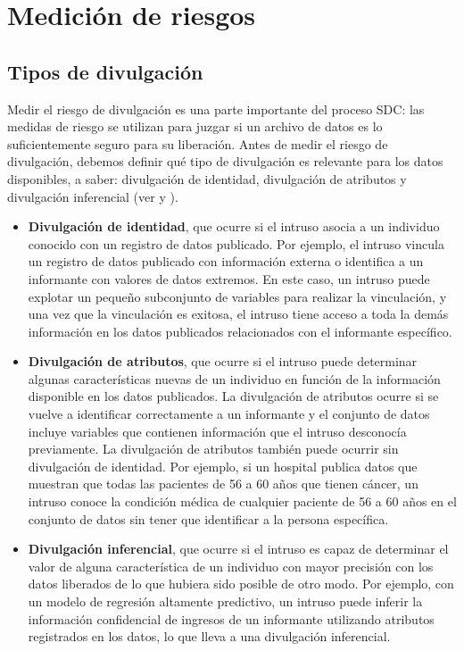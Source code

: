 \documentclass[]{book}
\theoremstyle{definition}
\theoremstyle{definition}
\theoremstyle{definition}
\theoremstyle{definition}
\theoremstyle{remark}
\begin{document}
\hypertarget{mediciuxf3n-de-riesgos}{%
\chapter{Medición de riesgos}\label{mediciuxf3n-de-riesgos}}

\hypertarget{tipos-de-divulgaciuxf3n}{%
\section{Tipos de divulgación}\label{tipos-de-divulgaciuxf3n}}

Medir el riesgo de divulgación es una parte importante del proceso SDC: las medidas de riesgo se utilizan para juzgar si un archivo de datos es lo suficientemente seguro para su liberación. Antes de medir el riesgo de divulgación, debemos definir qué tipo de divulgación es relevante para los datos disponibles, a saber: divulgación de identidad, divulgación de atributos y divulgación inferencial (ver \citet{lambert1993} y \citet{hundepool2012}).

\begin{itemize}
\item
  \textbf{Divulgación de identidad}, que ocurre si el intruso asocia a un individuo conocido con un registro de datos publicado. Por ejemplo, el intruso vincula un registro de datos publicado con información externa o identifica a un informante con valores de datos extremos. En este caso, un intruso puede explotar un pequeño subconjunto de variables para realizar la vinculación, y una vez que la vinculación es exitosa, el intruso tiene acceso a toda la demás información en los datos publicados relacionados con el informante específico.
\item
  \textbf{Divulgación de atributos}, que ocurre si el intruso puede determinar algunas características nuevas de un individuo en función de la información disponible en los datos publicados. La divulgación de atributos ocurre si se vuelve a identificar correctamente a un informante y el conjunto de datos incluye variables que contienen información que el intruso desconocía previamente. La divulgación de atributos también puede ocurrir sin divulgación de identidad. Por ejemplo, si un hospital publica datos que muestran que todas las pacientes de 56 a 60 años que tienen cáncer, un intruso conoce la condición médica de cualquier paciente de 56 a 60 años en el conjunto de datos sin tener que identificar a la persona específica.
\item
  \textbf{Divulgación inferencial}, que ocurre si el intruso es capaz de determinar el valor de alguna característica de un individuo con mayor precisión con los datos liberados de lo que hubiera sido posible de otro modo. Por ejemplo, con un modelo de regresión altamente predictivo, un intruso puede inferir la información confidencial de ingresos de un informante utilizando atributos registrados en los datos, lo que lleva a una divulgación inferencial.
\end{itemize}
\end{document}

